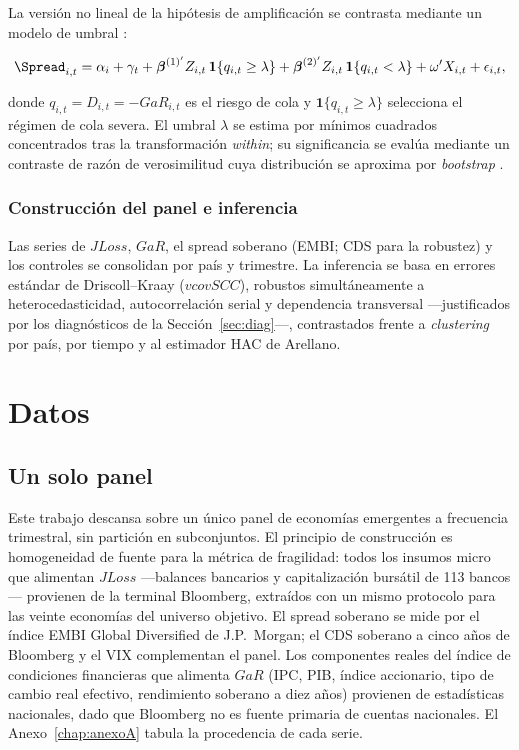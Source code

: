 La versión no lineal de la hipótesis de amplificación se contrasta mediante un modelo de umbral \citep{Hansen1999,Hansen2000}:

\[ \Spread_{i,t} = \alpha_i + \gamma_t + \boldsymbol{\beta}^{(1)'} Z_{i,t}\,\mathbf{1}\{q_{i,t}\ge\lambda\} + \boldsymbol{\beta}^{(2)'} Z_{i,t}\,\mathbf{1}\{q_{i,t}<\lambda\} + \omega'X_{i,t} + \epsilon_{i,t}, \]

donde $q_{i,t}=D_{i,t}=-GaR_{i,t}$ es el riesgo de cola y $\mathbf{1}\{q_{i,t}\ge\lambda\}$ selecciona el régimen de cola severa. El umbral $\lambda$ se estima por mínimos cuadrados concentrados tras la transformación \textit{within}; su significancia se evalúa mediante un contraste de razón de verosimilitud cuya distribución se aproxima por \textit{bootstrap} \citep{Hansen2000}.

\subsubsection{Construcción del panel e inferencia}

Las series de $JLoss$, $GaR$, el spread soberano (EMBI; CDS para la robustez) y los controles se consolidan por país y trimestre. La inferencia se basa en errores estándar de Driscoll–Kraay \citep{DriscollKraay1998} ($vcovSCC$), robustos simultáneamente a heterocedasticidad, autocorrelación serial y dependencia transversal —justificados por los diagnósticos de la Sección~\ref{sec:diag}—, contrastados frente a \textit{clustering} por país, por tiempo y al estimador HAC de Arellano.

\section{Datos}

\subsection{Un solo panel}

Este trabajo descansa sobre un único panel de economías emergentes a frecuencia trimestral, sin partición en subconjuntos. El principio de construcción es homogeneidad de fuente para la métrica de fragilidad: todos los insumos micro que alimentan $JLoss$ —balances bancarios y capitalización bursátil de 113 bancos— provienen de la terminal Bloomberg, extraídos con un mismo protocolo para las veinte economías del universo objetivo. El spread soberano se mide por el índice EMBI Global Diversified de J.P.\ Morgan; el CDS soberano a cinco años de Bloomberg y el VIX complementan el panel. Los componentes reales del índice de condiciones financieras que alimenta $GaR$ (IPC, PIB, índice accionario, tipo de cambio real efectivo, rendimiento soberano a diez años) provienen de estadísticas nacionales, dado que Bloomberg no es fuente primaria de cuentas nacionales. El Anexo~\ref{chap:anexoA} tabula la procedencia de cada serie.


